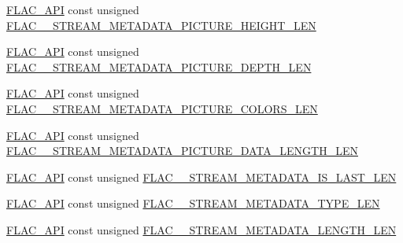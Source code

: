\begin{DoxyCompactItemize}
\item 
\mbox{\hyperlink{group__flac__export_ga56ca07df8a23310707732b1c0007d6f5}{F\+L\+A\+C\+\_\+\+A\+PI}} const unsigned \mbox{\hyperlink{group__flac__format_gab072f764d249b491b42514c8a1d18d22}{F\+L\+A\+C\+\_\+\+\_\+\+S\+T\+R\+E\+A\+M\+\_\+\+M\+E\+T\+A\+D\+A\+T\+A\+\_\+\+P\+I\+C\+T\+U\+R\+E\+\_\+\+H\+E\+I\+G\+H\+T\+\_\+\+L\+EN}}
\item 
\mbox{\hyperlink{group__flac__export_ga56ca07df8a23310707732b1c0007d6f5}{F\+L\+A\+C\+\_\+\+A\+PI}} const unsigned \mbox{\hyperlink{group__flac__format_gaf353f5e8c2a50d00e77f31b97fda078e}{F\+L\+A\+C\+\_\+\+\_\+\+S\+T\+R\+E\+A\+M\+\_\+\+M\+E\+T\+A\+D\+A\+T\+A\+\_\+\+P\+I\+C\+T\+U\+R\+E\+\_\+\+D\+E\+P\+T\+H\+\_\+\+L\+EN}}
\item 
\mbox{\hyperlink{group__flac__export_ga56ca07df8a23310707732b1c0007d6f5}{F\+L\+A\+C\+\_\+\+A\+PI}} const unsigned \mbox{\hyperlink{group__flac__format_ga3eb701d8a4cfab5c6b6e778a7a15cc95}{F\+L\+A\+C\+\_\+\+\_\+\+S\+T\+R\+E\+A\+M\+\_\+\+M\+E\+T\+A\+D\+A\+T\+A\+\_\+\+P\+I\+C\+T\+U\+R\+E\+\_\+\+C\+O\+L\+O\+R\+S\+\_\+\+L\+EN}}
\item 
\mbox{\hyperlink{group__flac__export_ga56ca07df8a23310707732b1c0007d6f5}{F\+L\+A\+C\+\_\+\+A\+PI}} const unsigned \mbox{\hyperlink{group__flac__format_ga30354d7318c03c9b272554eeb7d28719}{F\+L\+A\+C\+\_\+\+\_\+\+S\+T\+R\+E\+A\+M\+\_\+\+M\+E\+T\+A\+D\+A\+T\+A\+\_\+\+P\+I\+C\+T\+U\+R\+E\+\_\+\+D\+A\+T\+A\+\_\+\+L\+E\+N\+G\+T\+H\+\_\+\+L\+EN}}
\item 
\mbox{\hyperlink{group__flac__export_ga56ca07df8a23310707732b1c0007d6f5}{F\+L\+A\+C\+\_\+\+A\+PI}} const unsigned \mbox{\hyperlink{group__flac__format_ga52249514c52427990483b9f5a0ca7f93}{F\+L\+A\+C\+\_\+\+\_\+\+S\+T\+R\+E\+A\+M\+\_\+\+M\+E\+T\+A\+D\+A\+T\+A\+\_\+\+I\+S\+\_\+\+L\+A\+S\+T\+\_\+\+L\+EN}}
\item 
\mbox{\hyperlink{group__flac__export_ga56ca07df8a23310707732b1c0007d6f5}{F\+L\+A\+C\+\_\+\+A\+PI}} const unsigned \mbox{\hyperlink{group__flac__format_ga3804c687f8aef9c26369a63dd0a6b55c}{F\+L\+A\+C\+\_\+\+\_\+\+S\+T\+R\+E\+A\+M\+\_\+\+M\+E\+T\+A\+D\+A\+T\+A\+\_\+\+T\+Y\+P\+E\+\_\+\+L\+EN}}
\item 
\mbox{\hyperlink{group__flac__export_ga56ca07df8a23310707732b1c0007d6f5}{F\+L\+A\+C\+\_\+\+A\+PI}} const unsigned \mbox{\hyperlink{group__flac__format_ga4e565861db32c57c2f6bc71e9f1207a9}{F\+L\+A\+C\+\_\+\+\_\+\+S\+T\+R\+E\+A\+M\+\_\+\+M\+E\+T\+A\+D\+A\+T\+A\+\_\+\+L\+E\+N\+G\+T\+H\+\_\+\+L\+EN}}
\end{DoxyCompactItemize}


